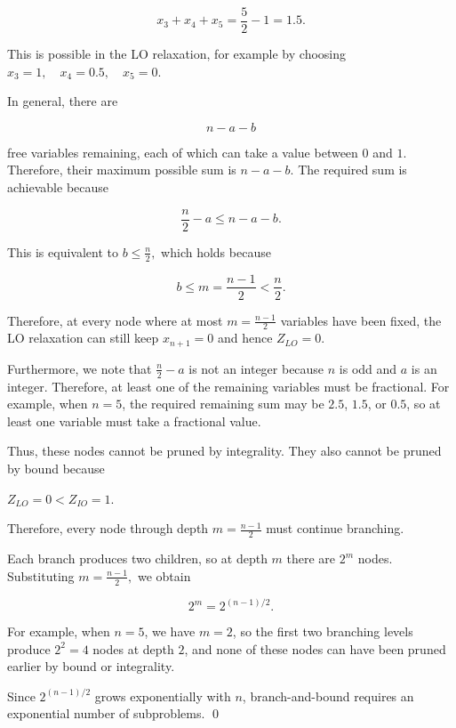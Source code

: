 \documentclass{article}
\begin{document}
\[
x_3+x_4+x_5=\frac{5}{2}-1=1.5.
\]

This is possible in the LO relaxation, for example by choosing $
x_3=1, \quad x_4=0.5, \quad x_5=0.
$

In general, there are

\[
n-a-b
\]

free variables remaining, each of which can take a value between $0$ and $1$. Therefore, their maximum possible sum is $n-a-b$. The required sum is achievable because

\[
\frac{n}{2}-a\leq n-a-b.
\]

This is equivalent to $
b\leq\frac{n}{2},
$ which holds because

\[
b\leq m=\frac{n-1}{2}<\frac{n}{2}.
\]

Therefore, at every node where at most
$ m=\frac{n-1}{2} $ variables have been fixed, the LO relaxation can still keep $
x_{n+1}=0
$ and hence $
Z_{LO}=0.
$ 

Furthermore, we note that $
\frac{n}{2}-a
$ is not an integer because $n$ is odd and $a$ is an integer. Therefore, at least one of the remaining variables must be fractional. For example, when $n=5$, the required remaining sum may be $2.5$, $1.5$, or $0.5$, so at least one variable must take a fractional value.

Thus, these nodes cannot be pruned by integrality. They also cannot be pruned by bound because 

$ 
Z_{LO}=0<Z_{IO}=1.
$ 

Therefore, every node through depth $
m=\frac{n-1}{2} $ must continue branching.

Each branch produces two children, so at depth $m$ there are  $2^m $ nodes. Substituting $
m=\frac{n-1}{2},
$ we obtain

\[
\boxed{2^m=2^{(n-1)/2}.}
\]

For example, when $n=5$, we have $m=2$, so the first two branching levels produce $
2^2=4 $ nodes at depth $2$, and none of these nodes can have been pruned earlier by bound or integrality.

Since $
2^{(n-1)/2} $ grows exponentially with $n$, branch-and-bound requires an exponential number of subproblems. \qed
\end{document}
